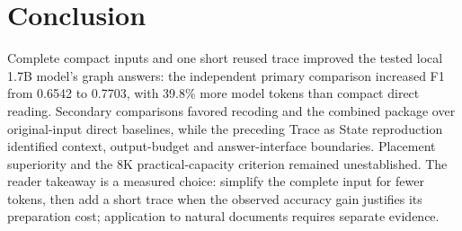 \section{Conclusion}
Complete compact inputs and one short reused trace improved the tested local 1.7B model's graph answers: the independent primary comparison increased F1 from 0.6542 to 0.7703, with 39.8\% more model tokens than compact direct reading. Secondary comparisons favored recoding and the combined package over original-input direct baselines, while the preceding Trace as State reproduction identified context, output-budget and answer-interface boundaries. Placement superiority and the 8K practical-capacity criterion remained unestablished. The reader takeaway is a measured choice: simplify the complete input for fewer tokens, then add a short trace when the observed accuracy gain justifies its preparation cost; application to natural documents requires separate evidence.

